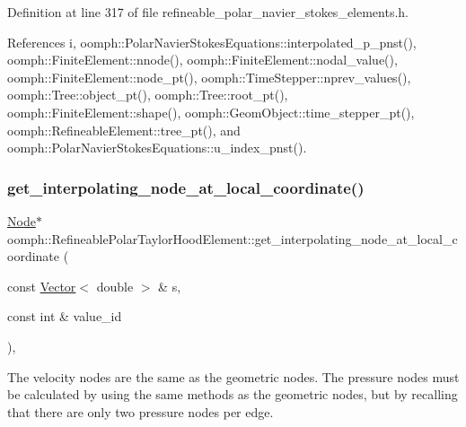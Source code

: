 Definition at line 317 of file refineable\+\_\+polar\+\_\+navier\+\_\+stokes\+\_\+elements.\+h.



References i, oomph\+::\+Polar\+Navier\+Stokes\+Equations\+::interpolated\+\_\+p\+\_\+pnst(), oomph\+::\+Finite\+Element\+::nnode(), oomph\+::\+Finite\+Element\+::nodal\+\_\+value(), oomph\+::\+Finite\+Element\+::node\+\_\+pt(), oomph\+::\+Time\+Stepper\+::nprev\+\_\+values(), oomph\+::\+Tree\+::object\+\_\+pt(), oomph\+::\+Tree\+::root\+\_\+pt(), oomph\+::\+Finite\+Element\+::shape(), oomph\+::\+Geom\+Object\+::time\+\_\+stepper\+\_\+pt(), oomph\+::\+Refineable\+Element\+::tree\+\_\+pt(), and oomph\+::\+Polar\+Navier\+Stokes\+Equations\+::u\+\_\+index\+\_\+pnst().

\mbox{\label{classoomph_1_1RefineablePolarTaylorHoodElement_a2fe498d948d77e7bc89e68c787b4e539}} 
\subsubsection{\texorpdfstring{get\+\_\+interpolating\+\_\+node\+\_\+at\+\_\+local\+\_\+coordinate()}{get\_interpolating\_node\_at\_local\_coordinate()}}
{\footnotesize\ttfamily \hyperlink{classoomph_1_1Node}{Node}$\ast$ oomph\+::\+Refineable\+Polar\+Taylor\+Hood\+Element\+::get\+\_\+interpolating\+\_\+node\+\_\+at\+\_\+local\+\_\+coordinate (\begin{DoxyParamCaption}\item[{const \hyperlink{classoomph_1_1Vector}{Vector}$<$ double $>$ \&}]{s,  }\item[{const int \&}]{value\+\_\+id }\end{DoxyParamCaption})\hspace{0.3cm}{\ttfamily [inline]}, {\ttfamily [virtual]}}



The velocity nodes are the same as the geometric nodes. The pressure nodes must be calculated by using the same methods as the geometric nodes, but by recalling that there are only two pressure nodes per edge. 

